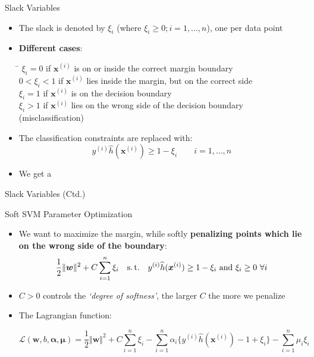 \begin{frame}{Slack Variables}{}
	\begin{itemize}
		\item The slack is denoted by $\xi_i$ (where $\xi_i \ge 0; i = 1, \dots, n$), one per data point
		\item \textbf{Different cases}:
		
		\footnotesize
		\begin{tabbing}
			\hspace*{2.5cm}\= \kill
			$\xi_i = 0$ 		\> if $\bm{x}^{(i)}$ is on or inside the correct margin boundary 		\\
			$0 < \xi_i < 1$ 		\> if $\bm{x}^{(i)}$ lies inside the margin, but on the correct side 		\\
			$\xi_i = 1$ 		\> if $\bm{x}^{(i)}$ is on the decision boundary 					\\
			$\xi_i > 1$ 		\> if $\bm{x}^{(i)}$ lies on the wrong side of the decision boundary (misclassification)
		\end{tabbing}
		\normalsize

		\item The classification constraints are replaced with:
		\begin{equation}
			y^{(i)} \widehat{h}(\bm{x}^{(i)}) \ge 1 - \xi_i \qquad i = 1, \dots, n
		\end{equation}
		\item We get a 
	\end{itemize}
\end{frame}


\begin{frame}{Slack Variables (Ctd.)}{}
	
\end{frame}


\begin{frame}{Soft SVM Parameter Optimization}{}
	\begin{itemize}
		\item We want to maximize the margin, while softly \textbf{penalizing points which lie on the wrong side of the boundary}:
		\begin{equation}
			\frac{1}{2} \Vert \bm{w} \Vert^2 + C \sum_{i=1}^n \xi_i
			\quad \text{s.\,t.} \quad y^{(i)} \widehat{h}(\bm{x}^{(i)}) \ge 1 - \xi_i\ \text{and}\ \xi_i \ge 0\ \forall i
		\end{equation}
		\item $C > 0$ controls the \textit{`degree of softness'}, the larger $C$ the more we penalize
		\item The Lagrangian function:
		
		\footnotesize
		\vspace*{-2mm}
		\begin{equation}
			\mathcal{L}(\bm{w}, b, \bm{\alpha}, \bm{\mu})
				= \frac{1}{2} \Vert \bm{w} \Vert^2 + C \sum_{i=1}^n \xi_i -
					\sum_{i=1}^n \alpha_i \{ y^{(i)} \widehat{h}(\bm{x}^{(i)}) - 1 + \xi_i \} - \sum_{i=1}^n \mu_i \xi_i
		\end{equation}
	\end{itemize}
\end{frame}


